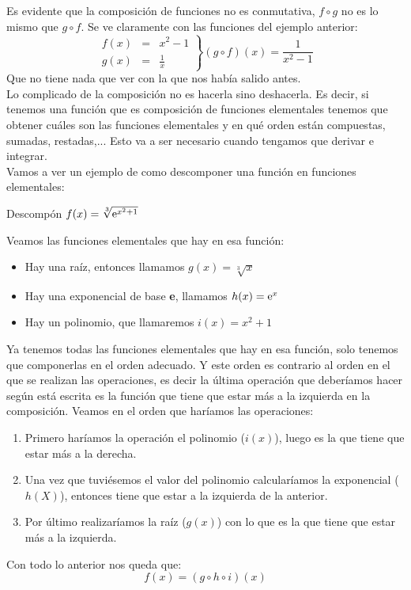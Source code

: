 \documentclass[a4paper,11pt,answers]{exam}
\begin{document}
Es evidente que la composición de funciones no es conmutativa, $f \circ g$ no es lo mismo que $g \circ f$. Se ve claramente con las funciones del ejemplo anterior:
\[\left.\begin{array}{lcl}
	f(x) &=& x^2 - 1\\
	g(x) &=& \frac{1}{x}
\end{array}\right\rbrace (g\circ f)(x) = \frac{1}{x^2 - 1}\]
Que no tiene nada que ver con la que nos había salido antes.\\

Lo complicado de la composición no es hacerla sino deshacerla. Es decir, si tenemos una función que es composición de funciones elementales tenemos que obtener cuáles son las funciones elementales y en qué orden están compuestas, sumadas, restadas,... Esto va a ser necesario cuando tengamos que derivar e integrar.\\
Vamos a ver un ejemplo de como descomponer una función en funciones elementales:
\begin{questions}
\question Descompón $f(x) = \sqrt[3]{\mathrm{e}^{x^2 + 1}}$
\begin{solution}

Veamos las funciones elementales que hay en esa función:
\begin{itemize}
	\item Hay una raíz, entonces llamamos $g(x) = \sqrt[3]{x}$
	\item Hay una exponencial de base \textbf{e}, llamamos $h(x) = \mathrm{e}^x$
	\item Hay un polinomio, que llamaremos $i(x) = x^2 +  1$
\end{itemize}

Ya tenemos  todas las funciones elementales que hay en esa función, solo tenemos que componerlas en el orden adecuado. Y este orden es contrario al orden en el que se realizan las operaciones, es decir la última operación que deberíamos hacer según está escrita es la función que tiene que estar más a la izquierda en la composición. Veamos en el orden que haríamos las operaciones:
\begin{enumerate}
	\item Primero haríamos la operación el polinomio ($i(x)$), luego es la que tiene que estar más a la derecha.
	\item Una vez que tuviésemos el valor del polinomio calcularíamos la exponencial ($h(X)$), entonces tiene que estar a la izquierda de la anterior.
	\item Por último realizaríamos la raíz ($g(x)$) con lo que es la que tiene que estar más a la izquierda.
\end{enumerate}

Con todo lo anterior nos queda que:
\[f(x) = (g \circ h \circ i)(x)\]
\end{solution}
\end{questions}
\end{document}
